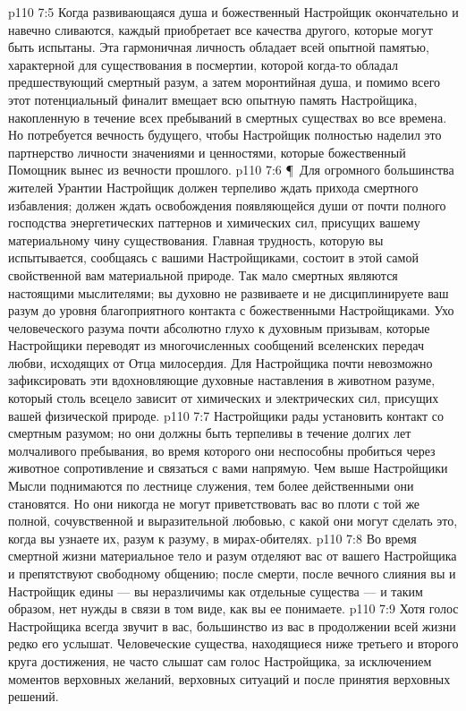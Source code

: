 \vs p110 7:5 Когда развивающаяся душа и божественный Настройщик окончательно и навечно сливаются, каждый приобретает все качества другого, которые могут быть испытаны. Эта гармоничная личность обладает всей опытной памятью, характерной для существования в посмертии, которой когда\hyp{}то обладал предшествующий смертный разум, а затем моронтийная душа, и помимо всего этот потенциальный финалит вмещает всю опытную память Настройщика, накопленную в течение всех пребываний в смертных существах во все времена. Но потребуется вечность будущего, чтобы Настройщик полностью наделил это партнерство личности значениями и ценностями, которые божественный Помощник вынес из вечности прошлого.
\vs p110 7:6 \P\ Для огромного большинства жителей Урантии Настройщик должен терпеливо ждать прихода смертного избавления; должен ждать освобождения появляющейся души от почти полного господства энергетических паттернов и химических сил, присущих вашему материальному чину существования. Главная трудность, которую вы испытывается, сообщаясь с вашими Настройщиками, состоит в этой самой свойственной вам материальной природе. Так мало смертных являются настоящими мыслителями; вы духовно не развиваете и не дисциплинируете ваш разум до уровня благоприятного контакта с божественными Настройщиками. Ухо человеческого разума почти абсолютно глухо к духовным призывам, которые Настройщики переводят из многочисленных сообщений вселенских передач любви, исходящих от Отца милосердия. Для Настройщика почти невозможно зафиксировать эти вдохновляющие духовные наставления в животном разуме, который столь всецело зависит от химических и электрических сил, присущих вашей физической природе.
\vs p110 7:7 Настройщики рады установить контакт со смертным разумом; но они должны быть терпеливы в течение долгих лет молчаливого пребывания, во время которого они неспособны пробиться через животное сопротивление и связаться с вами напрямую. Чем выше Настройщики Мысли поднимаются по лестнице служения, тем более действенными они становятся. Но они никогда не могут приветствовать вас во плоти с той же полной, сочувственной и выразительной любовью, с какой они могут сделать это, когда вы узнаете их, разум к разуму, в мирах\hyp{}обителях.
\vs p110 7:8 Во время смертной жизни материальное тело и разум отделяют вас от вашего Настройщика и препятствуют свободному общению; после смерти, после вечного слияния вы и Настройщик едины --- вы неразличимы как отдельные существа --- и таким образом, нет нужды в связи в том виде, как вы ее понимаете.
\vs p110 7:9 Хотя голос Настройщика всегда звучит в вас, большинство из вас в продолжении всей жизни редко его услышат. Человеческие существа, находящиеся ниже третьего и второго круга достижения, не часто слышат сам голос Настройщика, за исключением моментов верховных желаний, верховных ситуаций и после принятия верховных решений.
